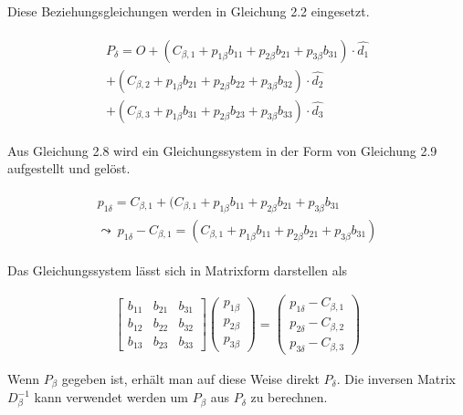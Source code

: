 Diese Beziehungsgleichungen werden in Gleichung 2.2 eingesetzt.

\begin{gather}
	\begin{split}
		P_\delta = O + (C_{\beta,1} + p_{1\beta}b_{11} +  p_{2\beta}b_{21} + p_{3\beta}b_{31}) \cdot \hat{d_1}\\
		+(C_{\beta,2} + p_{1\beta}b_{21} +  p_{2\beta}b_{22} + p_{3\beta}b_{32} )\cdot \hat{d_2}\\
		+ (C_{\beta,3} + p_{1\beta}b_{31} +  p_{2\beta}b_{23} + p_{3\beta}b_{33} )\cdot \hat{d_3}
	\end{split}
\end{gather}

Aus Gleichung 2.8 wird ein Gleichungssystem in der Form von Gleichung 2.9 aufgestellt und gelöst.

\begin{gather}
	\begin{split}
		p_{1\delta} = C_{\beta,1} + (C_{\beta,1} + p_{1\beta}b_{11} +  p_{2\beta}b_{21} + p_{3\beta}b_{31} \\
		\leadsto \: p_{1\delta} - C_{\beta,1} =  (C_{\beta,1} + p_{1\beta}b_{11} +  p_{2\beta}b_{21} + p_{3\beta}b_{31})
	\end{split}
\end{gather}

Das Gleichungssystem lässt sich in Matrixform darstellen als 

\begin{gather}
	\begin{bmatrix}b_{11} & b_{21} & b_{31}\\
		b_{12} & b_{22} & b_{32}\\
		b_{13} & b_{23} & b_{33}
	\end{bmatrix} 
	\begin{pmatrix}
		p_{1\beta}\\p_{2\beta}\\ p_{3\beta}
	\end{pmatrix} = 
	\begin{pmatrix}
		p_{1\delta} - C_{\beta,1}\\
		p_{2\delta} - C_{\beta,2}\\
		p_{3\delta} - C_{\beta,3}
	\end{pmatrix}
\end{gather}

Wenn $P_\beta$ gegeben ist, erhält man auf diese Weise direkt $P_\delta$. Die inversen Matrix $\ensuremath{D_\beta^{-1}}$ kann verwendet werden um  $P_\beta$ aus $P_\delta$ zu berechnen. 

